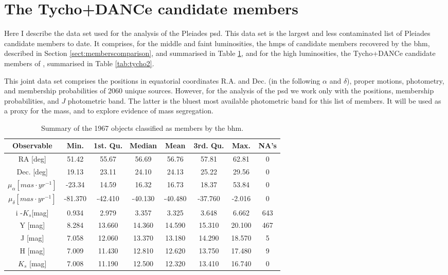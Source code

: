\section{The Tycho+DANCe candidate members}
\label{sect:Tycho+DANCe}
Here I describe the data set used for the analysis of the Pleiades \gls{psd}. This data set is the largest and less contaminated list of Pleiades candidate members to date. It comprises, for the middle and faint luminosities, the \gls{hmps} of candidate members recovered by the \gls{bhm}, described in Section \ref{sect:memberscomparison}, and summarised in Table \ref{tab:hmps}, and for the high luminosities, the Tycho+DANCe candidate members of \cite{Bouy2015}, summarised in Table \ref{tab:tycho2}.

This joint data set comprises the positions in equatorial coordinates R.A. and Dec. (in the following $\alpha$ and $\delta$), proper motions, photometry, and membership probabilities of 2060 unique sources. 
However, for the analysis of the \gls{psd} we work only with the positions, membership probabilities, and $J$ photometric band. The latter is the bluest most available photometric band for this list of members. It will be used as a proxy for the mass, and to explore evidence of mass segregation.

\begin{table}[ht!]
\caption{Summary of the 1967 objects classified as members by the \gls{bhm}.}
\begin{center}
\begin{tabular}{|c|c|c|c|c|c|c|c|}
\hline
Observable & Min. & 1st. Qu. & Median & Mean & 3rd. Qu. & Max. & NA's \\
\hline
\hline
RA [deg]   & 51.42 &  55.67 & 56.69 &  56.76  & 57.81  & 62.81 & 0\\
Dec. [deg] &19.13  & 23.11  & 24.10 &  24.13  & 25.22 &  29.56 &0\\
$\mu_{\alpha} [mas\cdot yr^{-1}]$&-23.34  & 14.59  & 16.32 &  16.73 &  18.37  & 53.84&0\\
$\mu_{\delta} [mas\cdot yr^{-1}]$&-81.370 &-42.410& -40.130& -40.480& -37.760&  -2.016&0\\
i -$K_s$[mag] &  0.934 &  2.979  & 3.357    & 3.325   &  3.648  &6.662   &643\\
Y [mag]           &   8.284 & 13.660 & 14.360  &14.590  &15.310  &20.100 &   467 \\
J [mag]           &   7.058 & 12.060& 13.370  & 13.180 & 14.290 & 18.570&      5\\
H [mag]          &   7.009 & 11.430 & 12.810  & 12.620 & 13.750 & 17.480&      9 \\
$K_s$ [mag]  &   7.008 & 11.190 & 12.500  & 12.320 & 13.410 & 16.740&    0\\
\hline
\end{tabular}
\end{center}
\label{tab:hmps}
\end{table}%


